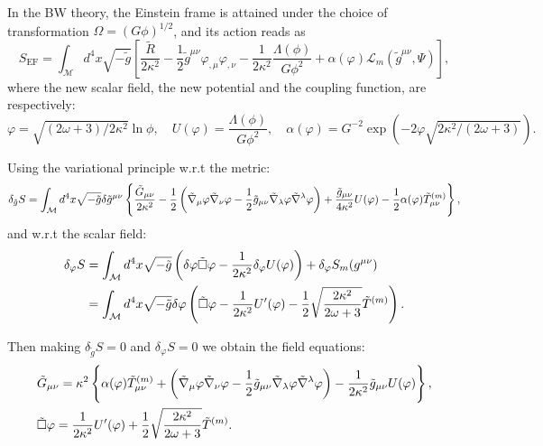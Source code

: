 In the BW theory, the Einstein frame is attained under the choice of transformation $\Omega=(G\phi)^{1/2}$, and its action reads as
\begin{equation}
    S_{\text{EF}}=\int_{\mathcal{M}}d^4x \sqrt{-\tilde{g}}\left[\frac{\tilde{R}}{2\kappa^2}-\frac{1}{2}\tilde{g}^{\mu\nu}\varphi_{,\mu}\varphi_{,\nu}-\frac{1}{2\kappa^2}\frac{\Lambda(\phi)}{G\phi^2}+\alpha(\varphi)\mathcal{L}_m(\tilde{g}^{\mu\nu},\Psi)\right],
\end{equation}
where the new scalar field, the new potential and the coupling function, are respectively:
\begin{equation}
    \varphi=\sqrt{\left(2\omega+3\right)/2\kappa^2}\ln\phi,\quad U(\varphi)=\frac{\Lambda(\phi)}{G\phi^2},\quad \alpha(\varphi)=G^{-2}\exp\left(-2\varphi\sqrt{2\kappa^2/\left(2\omega+3\right)}\right).
\end{equation}

Using the variational principle w.r.t the metric:
\begin{equation}
    \delta_{\Tilde{g}} S = \int_{\mathcal{M}} d^4x\sqrt{-\Tilde{g}} \delta \Tilde{g}^{\mu\nu}\left\{\frac{\Tilde{G}_{\mu\nu}}{2\kappa^2}-\frac{1}{2}\left(\Tilde{\nabla}_\mu\varphi\Tilde{\nabla}_\nu\varphi-\frac{1}{2}\tilde{g}_{\mu\nu}\Tilde{\nabla}_\lambda\varphi\Tilde{\nabla}^\lambda\varphi\right)+\frac{\tilde{g}_{\mu\nu}}{4\kappa^2}U(\varphi)-\frac{1}{2}\alpha(\varphi)\Tilde{T}_{\mu\nu}^{(m)}\right\},
\end{equation}
and w.r.t the scalar field:
\begin{align}
    \delta_\varphi S&=  \int_{\mathcal{M}} d^4x\sqrt{-\Tilde{g}}\left(\delta\varphi \Tilde{\Box}\varphi-\frac{1}{2\kappa^2}\delta_\varphi U(\varphi)\right) +\delta_\varphi S_m(g^{\mu\nu})\\
    &=\int_{\mathcal{M}} d^4x\sqrt{-\Tilde{g}}\delta\varphi\left(\tilde{\Box}\varphi-\frac{1}{2\kappa^2}U'(\varphi)-\frac{1}{2}\sqrt{\frac{2\kappa^2}{2\omega+3}}\tilde{T}^{(m)}\right).
\end{align}

Then making $\delta_{\tilde{g}}S=0$ and $\delta_\varphi S=0$ we obtain the field equations:
\begin{align}
    &\Tilde{G}_{\mu\nu}=\kappa^2\left\{\alpha(\varphi)\tilde{T}_{\mu\nu}^{(m)}+\left(\Tilde{\nabla}_\mu\varphi\Tilde{\nabla}_\nu\varphi-\frac{1}{2}\tilde{g}_{\mu\nu}\Tilde{\nabla}_\lambda\varphi\Tilde{\nabla}^\lambda\varphi\right)-\frac{1}{2\kappa^2}\tilde{g}_{\mu\nu}U(\varphi) \right\},\\
    &\tilde{\Box}\varphi=\frac{1}{2\kappa^2}U'(\varphi)+\frac{1}{2}\sqrt{\frac{2\kappa^2}{2\omega+3}}\tilde{T}^{(m)}.\label{eqn:scalar_field_field_bw_ef}
\end{align}






